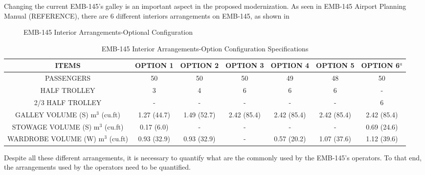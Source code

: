 Changing the current EMB-145's galley is an important aspect in the proposed modernization. As seen in EMB-145 Airport Planning Manual (REFERENCE), there are 6 different interiors arrangements on EMB-145, as shown in

\begin{figure}[H]
\caption{EMB-145 Interior Arrangements-Optional Configuration}
\label{fig:InteriorArrangements}
\end{figure}


\begin{table}[htbp]
  \centering
  \tiny
  \caption{EMB-145 Interior Arrangements-Option Configuration Specifications}
    \begin{tabular}{ccccccc}
    \toprule
    \textbf{ITEMS} & \textbf{OPTION 1} & \textbf{OPTION 2} & \textbf{OPTION 3} & \textbf{OPTION 4} & \textbf{OPTION 5} & \textbf{OPTION 6$^{a}$} \\
    \midrule
    PASSENGERS & 50    & 50    & 50    & 49    & 48    & 50 \\
    HALF TROLLEY & 3     & 4     & 6     & 6     & 6     & - \\
    2/3 HALF TROLLEY & -     & -     & -     & -     & -     & 6 \\
    GALLEY VOLUME (S) m$^{3}$ (cu.ft) & 1.27 (44.7) & 1.49 (52.7) & 2.42 (85.4) & 2.42 (85.4) & 2.42 (85.4) & 2.42 (85.4) \\
    STOWAGE VOLUME (S) m$^{3}$ (cu.ft) & 0.17 (6.0) & -     & -     & -     & -     & 0.69 (24.6) \\
    WARDROBE VOLUME (W) m$^{3}$ (cu.ft) & 0.93 (32.9) & 0.93 (32.9) & -     & 0.57 (20.2) & 1.07 (37.6) & 1.12 (39.6) \\
    \bottomrule
    \end{tabular}%
  \label{tab:InteriogArrangementOption}%
\end{table}%

Despite all these different arrangements, it is necessary to quantify what are the commonly used by the EMB-145's operators. To that end, the arrangements used by the operators need to be quantified.


